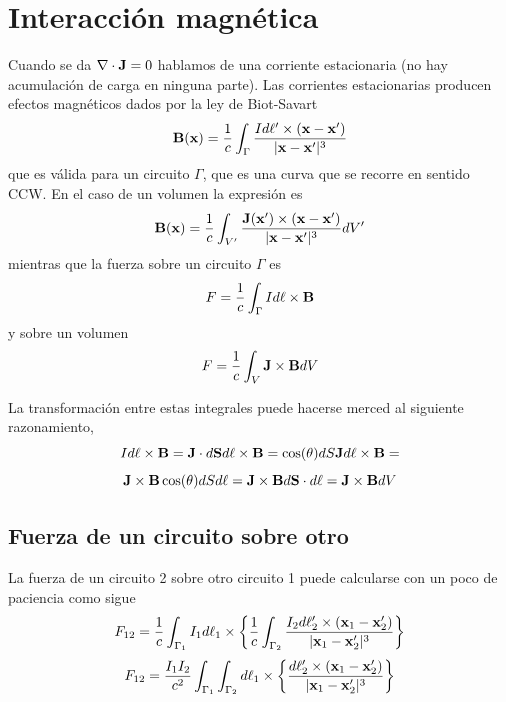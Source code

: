 \documentclass[10pt,oneside]{CBFT_book}
\begin{document}
\section{Interacción magnética}

Cuando se da $\nabla \cdot \vb{J}=0$ hablamos de una corriente estacionaria (no hay acumulación de carga en
ninguna parte). Las corrientes estacionarias producen efectos magnéticos dados por la ley de Biot-Savart
\[
	\vb{B}(\vb{x}) = \frac{1}{c} \int_\Gamma \frac{I d\vb{\ell}' \times (\vb{x} - \vb{x}')}{|\vb{x} - \vb{x}'|^3} 
\]
que es válida para un circuito $\Gamma$, que es una curva que se recorre en sentido CCW.
En el caso de un volumen la expresión es 
\[
	\vb{B}(\vb{x}) = \frac{1}{c} \int_{V'} \frac{ \vb{J}(\vb{x}') \times (\vb{x} - \vb{x}')}{|\vb{x} - \vb{x}'|^3} 
dV'
\]
mientras que la fuerza sobre un circuito $\Gamma$ es
\[
	F = \frac{1}{c} \int_\Gamma I d\vb{\ell} \times \vb{B}
\]
y sobre un volumen 
\[
	F = \frac{1}{c} \int_V \vb{J} \times \vb{B} dV
\]

La transformación entre estas integrales puede hacerse merced al siguiente razonamiento,
\[
  	I d\vb{\ell} \times \vb{B} = \vb{J}  \cdot d\vb{S} d\vb{\ell}  \times \vb{B} =
  	\cos(\theta) dS \vb{J} d\ell \times \vb{B} = 
\]
\[
	\vb{J} \times \vb{B}  \cos(\theta) dS d\ell  = \vb{J} \times \vb{B}  d\vb{S} \cdot d\vb{\ell}  = 
	\vb{J} \times \vb{B}  dV 
\]

\subsection{Fuerza de un circuito sobre otro}

La fuerza de un circuito 2 sobre otro circuito 1 puede calcularse con un poco de paciencia como sigue
\[
	F_{12} = \frac{1}{c} \int_{\Gamma_1} I_1 d\vb{\ell}_1 \times \left\{
	\frac{1}{c} \int_{\Gamma_2} \frac{I_2 d\vb{\ell}'_2 \times (\vb{x}_1 - \vb{x}'_2)}{|\vb{x}_1 - \vb{x}'_2|^3} 
	\right\}
\]
\[
	F_{12} = \frac{I_1 I_2}{c^2} \int_{\Gamma_1} \int_{\Gamma_2} d\vb{\ell}_1 \times \left\{
	\frac{d\vb{\ell}'_2 \times (\vb{x}_1 - \vb{x}'_2)}{|\vb{x}_1 - \vb{x}'_2|^3} 
	\right\}
\]
\end{document}
